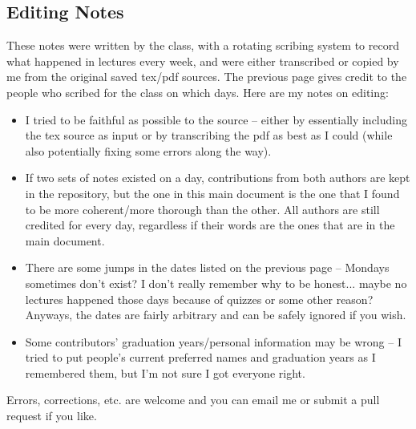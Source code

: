 \subsection{Editing Notes}
These notes were written by the class, with a rotating scribing system to record
what happened in lectures every week, and were either transcribed or copied by me
from the original saved tex/pdf sources. The previous page gives credit to the
people who scribed for the class on which days. Here are my notes on editing: 
\begin{itemize}
    \item I tried to be faithful as possible to the source -- either by essentially including 
    the tex source as input or by transcribing the pdf as best as I could (while also potentially
    fixing some errors along the way).
    \item If two sets of notes existed on a day, contributions from both authors are 
    kept in the repository, but the one in this main document is the one that I found to be
    more coherent/more thorough than the other. All authors are still credited for every day, 
    regardless if their words are the ones that are in the main document. 
    \item There are some jumps in the dates listed on the previous page 
    -- Mondays sometimes don't exist? I don't really remember why
    to be honest... maybe no lectures happened those days because of quizzes or some other 
    reason? Anyways, the dates are fairly arbitrary and can be safely ignored if you wish. 
    \item Some contributors' graduation years/personal information may be wrong -- I tried to 
    put people's current preferred names and graduation years as I remembered them, but I'm 
    not sure I got everyone right. 
\end{itemize}
Errors, corrections, etc. are welcome and you can email me or submit a pull request if you like.